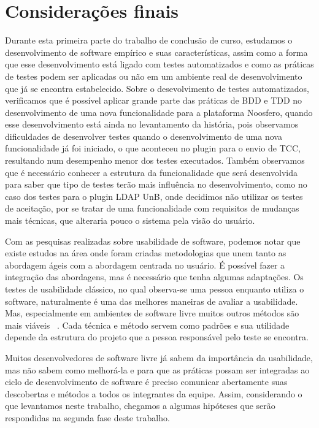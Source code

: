 \chapter{Considerações finais}
\label{consideracoes-finais}

Durante esta primeira parte do trabalho de conclusão de curso, estudamos o desenvolvimento de software empírico e suas características, assim como a forma que esse desenvolvimento está ligado com testes automatizados e como as práticas de testes podem ser aplicadas ou não em um ambiente real de desenvolvimento que já se encontra estabelecido.
%
Sobre o desevolvimento de testes automatizados, verificamos que é possível aplicar grande parte das práticas de BDD e TDD no desenvolvimento de uma nova funcionalidade para a plataforma Noosfero, quando esse desenvolvimento está ainda no levantamento da história, pois observamos dificuldades de desenvolver testes quando o desenvolvimento de uma nova funcionalidade já foi iniciado, o que aconteceu no plugin para o envio de TCC, resultando num desempenho menor dos testes executados.
%
Também observamos que é necessário conhecer a estrutura da funcionalidade que será desenvolvida para saber que tipo de testes terão mais influência no desenvolvimento, como no caso dos testes para o plugin LDAP UnB, onde decidimos não utilizar os testes de aceitação, por se tratar de uma funcionalidade com requisitos de mudanças mais técnicas, que alteraria pouco o sistema pela visão do usuário.

Com as pesquisas realizadas sobre usabilidade de software, podemos notar que existe estudos na área onde foram criadas metodologias que unem tanto as abordagem ágeis com a abordagem centrada no usuário. É possível fazer a integração das abordagens, mas é necessário que tenha algumas adaptações.
%
Os testes de usabilidade clássico, no qual observa-se uma pessoa enquanto utiliza o software, naturalmente é uma das melhores maneiras de avaliar a usabilidade. Mas, especialmente em ambientes de software livre muitos outros métodos são mais viáveis ~\cite{borchardt2011}.
%
Cada técnica e método servem como padrões e sua utilidade depende da estrutura do projeto que a pessoa responsável pelo teste se encontra. 

Muitos desenvolvedores de software livre já sabem da importância da usabilidade, mas não sabem como melhorá-la e para que as práticas possam ser integradas ao ciclo de desenvolvimento de software é preciso comunicar abertamente suas descobertas e métodos a todos os integrantes da equipe.
%
Assim, considerando o que levantamos neste trabalho, chegamos a algumas hipóteses que serão respondidas na segunda fase deste trabalho.

